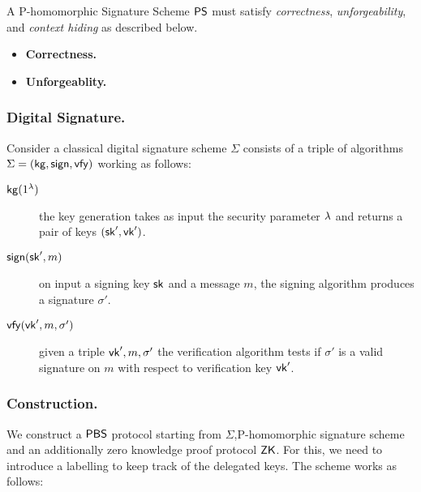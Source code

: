 \documentclass[11pt]{llncs}
\begin{document}
A P-homomorphic Signature Scheme ${\sf PS}$ must satisfy {\em correctness}, {\em unforgeability},  and {\em context hiding}
as described below. 
\begin{itemize}

\item \textbf{Correctness.} 
%



\item \textbf{Unforgeablity.} 
\end{itemize}

\subsubsection{Digital Signature.}
Consider a classical digital signature scheme $\Sigma$ consists of a triple of algorithms  $\Sigma=({\sf kg},{\sf sign},{\sf vfy})$ working as follows:
\begin{description}
  \item[${\sf kg}(1^{\lambda})$] the key generation takes as input the security parameter $\lambda$ and returns a pair of keys $({\sf sk}',{\sf vk}')$.
  \item[${\sf sign}({\sf sk}', m)$] on input a signing key ${\sf sk}$ and a message $m$, the signing algorithm produces 
  a signature $\sigma'$.
  \item[${\sf vfy}({\sf vk}', m, \sigma')$]  given a triple ${\sf vk}',m,\sigma'$ the verification algorithm tests if $\sigma'$ is a valid signature on $m$ with respect to verification key ${\sf vk}'$.
\end{description} 


\subsubsection{Construction.}
We construct a ${\sf PBS}$ protocol starting from $\Sigma$,P-homomorphic signature scheme  and an additionally zero knowledge proof protocol ${\sf ZK}$. For this, we need to introduce a labelling to keep track of the delegated keys. The scheme works as follows:\\
\end{document}
